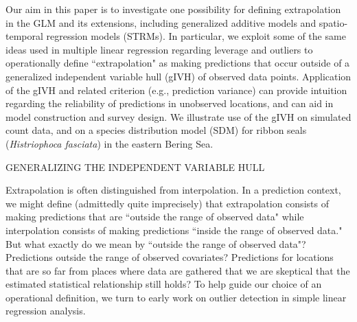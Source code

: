 \documentclass[12pt,english]{article}
\begin{document}
\begin{spacing}{1.9}
Our aim in this paper is to investigate one possibility for defining extrapolation in the GLM and its extensions, including generalized additive models \citep[GAMs;][]{HastieTibshirani1999,Wood2006} and spatio-temporal regression models (STRMs).  In particular, we exploit some of the same ideas used in multiple linear regression regarding leverage and outliers \citep{Cook1979} to operationally define ``extrapolation" as making predictions that occur outside of a generalized independent variable hull (gIVH) of observed data points. Application of the gIVH and related criterion (e.g., prediction variance) can provide intuition regarding the reliability of predictions in unobserved locations, and can aid in model construction and survey design. We illustrate use of the gIVH on simulated count data, and on a species distribution model (SDM) for ribbon seals ({\it Histriophoca fasciata}) in the eastern Bering Sea.

\centerline{\sc GENERALIZING THE INDEPENDENT VARIABLE HULL}

Extrapolation is often distinguished from interpolation.  In a prediction context, we might define (admittedly quite imprecisely) that extrapolation consists of making predictions that are ``outside the range of observed data" while interpolation consists of making predictions ``inside the range of observed data."  But what exactly do we mean by ``outside the range of observed data"?  Predictions outside the range of observed covariates?  Predictions for locations that are so far from places where data are gathered that we are skeptical that the estimated statistical relationship still holds? To help guide our choice of an operational definition, we turn to early work on outlier detection in simple linear regression analysis.


\end{spacing}
\end{document}
